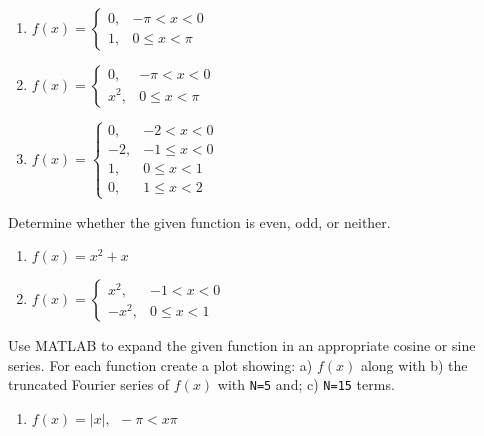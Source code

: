 \begin{fullwidth}
\begin{enumerate}[resume]
\item $f(x) = 
\begin{cases}
0, & -\pi < x < 0 \\
1, & 0 \le x < \pi
\end{cases}$


\vspace{1.0cm}

\item $f(x) = 
\begin{cases}
0, & -\pi < x < 0 \\
x^2, & 0 \le x < \pi
\end{cases}$

\vspace{1.0cm}

\item $f(x) = 
\begin{cases}
0, & -2 < x < 0 \\
-2, & -1 \le x < 0 \\
1, & 0 \le x < 1 \\
0, & 1 \le x < 2
\end{cases}$

\end{enumerate}

\vspace{1.5cm}

\noindent Determine whether the given function is even, odd, or neither.
\begin{enumerate}[resume]
\item $f(x) = x^2+x$

\vspace{1.0cm}

\item $f(x) =
\begin{cases}
x^2, & -1 < x < 0 \\
-x^2, & 0 \le x < 1
\end{cases}$
\end{enumerate}

\vspace{1.5cm}

\noindent Use MATLAB to expand the given function in an appropriate cosine or sine series.  For each function create a plot showing: a) $f(x)$ along with b) the truncated Fourier series of $f(x)$ with \lstinline{N=5} and; c) \lstinline{N=15} terms.

\begin{enumerate}[resume]
\item $f(x) = \left| x \right|, \ \ -\pi < x \pi$


\end{enumerate}
\end{fullwidth}
